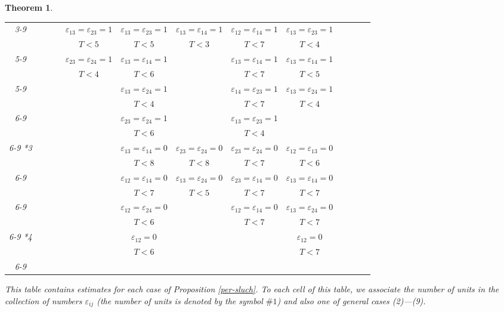 \documentclass[14pt]{article}
\newtheorem{theorem}{\indent Theorem}[section]
\begin{document}
\begin{theorem}
\begin{footnotesize}
\begin{tabular}{|c|c|*{10}{c|}|c|}
\\ \cline{3-9}
&  &  &  &  $\varepsilon_{13} =\varepsilon_{23} = 1$ &
$\varepsilon_{13} =\varepsilon_{23} = 1$ & $\varepsilon_{13}
=\varepsilon_{14} = 1$ &
$\varepsilon_{12} =\varepsilon_{14} = 1$ & $\varepsilon_{13}
=\varepsilon_{23} = 1$  \\
  &  &  &   & $T<5$ & $T<5$ & $T<3$ & $T<7$ & $T<4$ \\ \cline{5-9}
  &  &  &  & $\varepsilon_{23} =\varepsilon_{24} = 1$
& $\varepsilon_{13} =\varepsilon_{14} = 1$ &  & $\varepsilon_{13}
=\varepsilon_{14} = 1$ &
  $\varepsilon_{13} =\varepsilon_{14} = 1$\\
  &  &  &  & $T<4$  & $T<6$ &  & $T<7$ & $T<5$ \\ \cline{5-9}
  &  &  &  &  & $\varepsilon_{13} =\varepsilon_{24} = 1$& &
$\varepsilon_{14} =\varepsilon_{23} = 1$   &$\varepsilon_{13}
=\varepsilon_{24} = 1$\\
  &  &  &  & & $T<4$ &  & $T<7$ &  $T<4$ \\ \cline{6-9}
&  &  &  &  & $\varepsilon_{23} =\varepsilon_{24} = 1$& &
$\varepsilon_{13} =\varepsilon_{23} = 1$& \\
 &  &  &  &  & $T<6$ &  &  $T<4$ &  \\ \cline{6-9}
\hline
\hline
\multirow{3}*{3}  &  &   &  &    &  $\varepsilon_{13}
=\varepsilon_{14} = 0$ &  $\varepsilon_{23} =\varepsilon_{24} = 0$
&  $\varepsilon_{23} =\varepsilon_{24} = 0$ &  $\varepsilon_{12}
=\varepsilon_{13} = 0$  \\
& &  &  & & $T<8$ & $T<8$ &  $T<7$ & $T<6$ \\ \cline{6-9}
&  &  &  &  &  $\varepsilon_{12} =\varepsilon_{14} = 0$ &
$\varepsilon_{13} =\varepsilon_{24} = 0$
& $\varepsilon_{23} =\varepsilon_{14} = 0$ & $\varepsilon_{13}
=\varepsilon_{14} = 0$ \\
 &  &  &   &  & $T<7$ & $T<5$ & $T<7$ & $T<7$ \\ \cline{6-9}
 &  &  &  &  & $\varepsilon_{12} =\varepsilon_{24} = 0$ &
& $\varepsilon_{12} =\varepsilon_{14} = 0$
 &   $\varepsilon_{13} =\varepsilon_{24} = 0$\\
  &  &  &  &  & $T<6$ &  & $T<7$ &  $T<7$\\ \cline{6-9}
\hline
\hline
\multirow{2}*{4}   &  &  &  &   & $\varepsilon_{12} = 0$ &  &
&  $\varepsilon_{12} = 0$ \\
&  &  &  & & $T<6$  &  &  &  $T<7$  \\ \cline{6-9}
\hline
\end{tabular}
\end{footnotesize}
\vskip 0.5cm

This table contains estimates for each case of Proposition \ref{per-sluch}.
To each cell of this table, we  associate the number of units in the collection of
numbers $\varepsilon_{ij}$ (the number of units is denoted by the symbol
$\# 1$) and also one of general cases (2)---(9).
\end{theorem}
\end{document}
